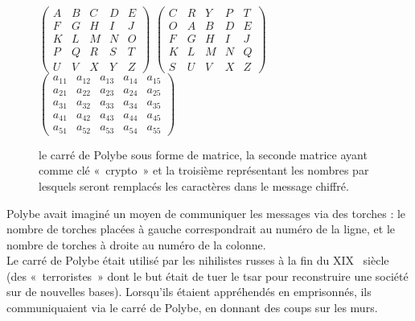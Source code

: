\begin{figure}[h]
  $
  \left(
    \begin{array}{ccccc}
      A & B & C & D & E \\
      F & G & H & I & J \\
      K & L & M & N & O \\
      P & Q & R & S & T \\
      U & V & X & Y & Z
    \end{array}
  \right)
  $
  \hfill
  $
  \left(
    \begin{array}{ccccc}
      C & R & Y & P & T \\
      O & A & B & D & E \\
      F & G & H & I & J \\
      K & L & M & N & Q \\
      S & U & V & X & Z
    \end{array}
  \right)
  $
  \hfill
  $
  \left(
    \begin{array}{ccccc}
      a_{11} & a_{12} & a_{13} & a_{14} & a_{15}  \\
      a_{21} & a_{22} & a_{23} & a_{24} & a_{25}  \\
      a_{31} & a_{32} & a_{33} & a_{34} & a_{35}  \\
      a_{41} & a_{42} & a_{43} & a_{44} & a_{45}  \\
      a_{51} & a_{52} & a_{53} & a_{54} & a_{55}
    \end{array}
  \right)
  $
  \caption{le carré de Polybe sous forme de matrice, la seconde
    matrice ayant comme clé «~crypto~» et la troisième représentant
    les nombres par lesquels seront remplacés les caractères dans le
    message chiffré.}
  \label{fig:Polybe}
\end{figure}

Polybe avait imaginé un moyen de communiquer les messages via des torches
: le nombre de torches placées à gauche correspondrait au numéro de la
ligne, et le nombre de torches à droite au numéro de la colonne. \\

Le carré de Polybe était utilisé par les nihilistes russes à la
fin du 
XIX\ieme~ siècle (des «~terroristes~» dont le but était de
tuer le tsar pour reconstruire une société sur de nouvelles
bases). Lorsqu'ils étaient appréhendés en emprisonnés, ils
communiquaient via le carré de Polybe, en donnant des coups sur les
murs. 

